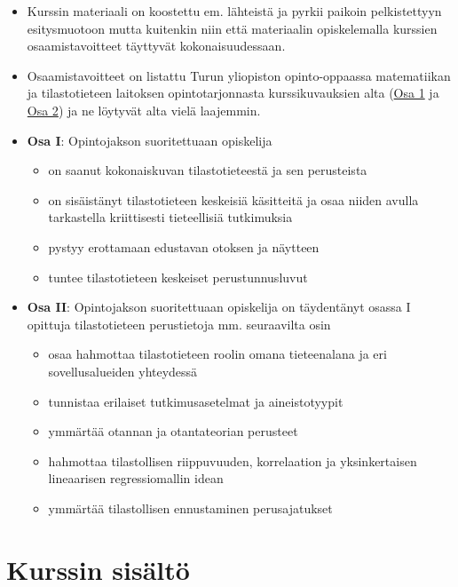 \documentclass[
]{book}
\providecommand{\tightlist}{%
  \setlength{\itemsep}{0pt}\setlength{\parskip}{0pt}}
\begin{document}
\begin{itemize}
\item
  Kurssin materiaali on koostettu em. lähteistä ja pyrkii paikoin pelkistettyyn esitysmuotoon mutta kuitenkin niin että materiaalin opiskelemalla kurssien osaamistavoitteet täyttyvät kokonaisuudessaan.
\item
  Osaamistavoitteet on listattu Turun yliopiston opinto-oppaassa matematiikan ja tilastotieteen laitoksen opintotarjonnasta kurssikuvauksien alta (\href{https://opas.peppi.utu.fi/fi/opintojakso/TILM3712/102471?period=2024-2027}{Osa 1} ja \href{https://opas.peppi.utu.fi/fi/opintojakso/TILM3713/102472?period=2024-2027}{Osa 2}) ja ne löytyvät alta vielä laajemmin.
\item
  \textbf{Osa I}: Opintojakson suoritettuaan opiskelija

  \begin{itemize}
  \tightlist
  \item
    on saanut kokonaiskuvan tilastotieteestä ja sen perusteista
  \item
    on sisäistänyt tilastotieteen keskeisiä käsitteitä ja osaa niiden avulla tarkastella kriittisesti tieteellisiä tutkimuksia
  \item
    pystyy erottamaan edustavan otoksen ja näytteen
  \item
    tuntee tilastotieteen keskeiset perustunnusluvut
  \end{itemize}
\item
  \textbf{Osa II}: Opintojakson suoritettuaan opiskelija on täydentänyt osassa I opittuja tilastotieteen perustietoja mm. seuraavilta osin

  \begin{itemize}
  \tightlist
  \item
    osaa hahmottaa tilastotieteen roolin omana tieteenalana ja eri sovellusalueiden yhteydessä
  \item
    tunnistaa erilaiset tutkimusasetelmat ja aineistotyypit
  \item
    ymmärtää otannan ja otantateorian perusteet
  \item
    hahmottaa tilastollisen riippuvuuden, korrelaation ja yksinkertaisen lineaarisen regressiomallin idean
  \item
    ymmärtää tilastollisen ennustaminen perusajatukset
  \end{itemize}
\end{itemize}

\hypertarget{kurssin-sisuxe4ltuxf6}{%
\chapter*{Kurssin sisältö}\label{kurssin-sisuxe4ltuxf6}}
\end{document}
